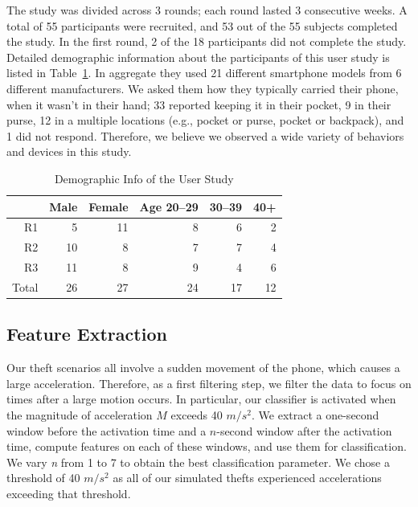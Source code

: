 \documentclass{soups}
\begin{document}
The study was divided across 3 rounds; each round lasted 3 consecutive weeks. 
A total of 55 participants were recruited, and
53 out of the 55 subjects completed the study. 
In the first round, 2 of the 18 participants did not complete the study.
Detailed demographic information about the participants of this user study is listed in Table~\ref{tbl:demographics}.
In aggregate they used 21 different smartphone models from 6 different manufacturers.
We asked them how they typically carried their phone, when it wasn't in their hand; 33 reported keeping it in their pocket, 9 in their purse, 12 in a multiple locations (e.g., pocket or purse, pocket or backpack), and 1 did not respond.
Therefore, we believe we observed a wide variety of behaviors and devices in this study.

\begin{table}[H]
\centering
\begin{tabular}{rrrrrr}
\hline
      & Male & Female & Age 20--29 & 30--39 & 40+ \\ \hline
R1    & 5    & 11     & 8         & 6     & 2   \\
R2    & 10   & 8      & 7         & 7     & 4   \\
R3    & 11   & 8      & 9         & 4     & 6   \\
Total & 26   & 27     & 24        & 17    & 12  \\ \hline
\end{tabular}
\caption{Demographic Info of the User Study}
\label{tbl:demographics}
\end{table}




\subsection{Feature Extraction}

Our theft scenarios all involve a sudden movement of the phone, which causes a large acceleration.
Therefore, as a first filtering step, we filter the data to focus on times after a large motion occurs.
In particular, our classifier is activated when the magnitude of acceleration $M$ exceeds 40 $m/s^2$.
We extract a one-second window before the activation time and a $n$-second window after the activation time, compute features on each of these windows, and use them for classification.
We vary \textit{n} from 1 to 7 to obtain the best classification parameter.
We chose a threshold of 40 $m/s^2$ as all of our simulated thefts experienced accelerations exceeding that threshold.
\end{document}
